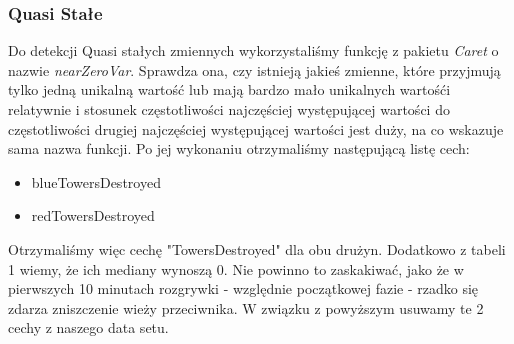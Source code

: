 \documentclass[twoside]{customStyle}
\begin{document}
\subsubsection{Quasi Stałe}
\indent Do detekcji Quasi stałych zmiennych wykorzystaliśmy funkcję z pakietu \textit{Caret} o nazwie \textit{nearZeroVar}. Sprawdza ona, czy istnieją jakieś zmienne, które przyjmują tylko jedną unikalną wartość lub mają bardzo mało unikalnych wartośći relatywnie i stosunek częstotliwości najczęściej występującej wartości do częstotliwości drugiej najczęściej występującej wartości jest duży, na co wskazuje sama nazwa funkcji. Po jej wykonaniu otrzymaliśmy następującą listę cech:
\begin{itemize}
	\item blueTowersDestroyed 
	\item redTowersDestroyed
\end{itemize}
\indent Otrzymaliśmy więc cechę "TowersDestroyed" dla obu drużyn. Dodatkowo z tabeli 1 wiemy, że ich mediany wynoszą 0. Nie powinno to zaskakiwać, jako że w pierwszych 10 minutach rozgrywki - względnie początkowej fazie - rzadko się zdarza zniszczenie wieży przeciwnika. W związku z powyższym usuwamy te 2 cechy z naszego data setu.
\newpage
\end{document}
